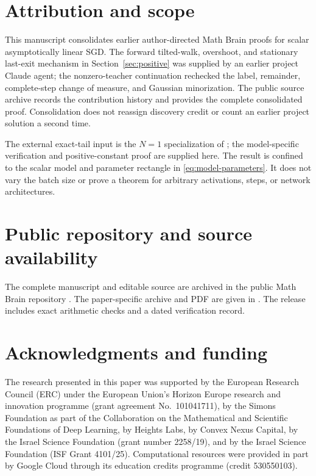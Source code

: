 \documentclass[11pt,a4paper]{article}
\numberwithin{equation}{section}
\theoremstyle{remark}
\begin{document}
\section{Attribution and scope}\label{sec:attribution}

This manuscript consolidates earlier author-directed Math Brain proofs
for scalar asymptotically linear SGD. The forward tilted-walk,
overshoot, and stationary last-exit mechanism in Section~\ref{sec:positive}
was supplied by an earlier project Claude agent; the nonzero-teacher
continuation rechecked the
label, remainder, complete-step change of measure, and Gaussian
minorization. The public source archive records the contribution history and provides
the complete consolidated proof. Consolidation does not reassign
discovery credit or count an earlier project solution a second time.

The external exact-tail input is the $N=1$ specialization of
\cite[Theorem 3.1]{JO2012Thm31}; the model-specific verification and
positive-constant proof are supplied here. The result is confined to the
scalar model and parameter rectangle in \eqref{eq:model-parameters}.
It does not vary the batch size or prove a theorem for arbitrary
activations, steps, or network architectures.

\section*{Public repository and source availability}
The complete manuscript and editable source are archived in the public
Math Brain repository \cite{MathBrainRepo}. The paper-specific archive
and PDF are given in \cite{ThisPaperArchive}. The release includes exact
arithmetic checks and a dated verification record.

\section*{Acknowledgments and funding}
The research presented in this paper was supported by the European Research Council (ERC) under the European Union's Horizon Europe research and innovation programme (grant agreement No.~101041711), by the Simons Foundation as part of the Collaboration on the Mathematical and Scientific Foundations of Deep Learning, by Heights Labs, by Convex Nexus Capital, by the Israel Science Foundation (grant number 2258/19), and by the Israel Science Foundation (ISF Grant 4101/25). Computational resources were provided in part by Google Cloud through its education credits programme (credit 530550103).
\end{document}
